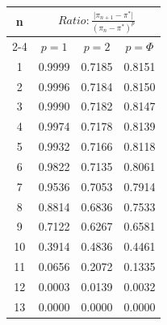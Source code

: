 \documentclass{article}
\providecommand{\abs}[1]{\lvert#1\rvert}
\begin{document}
\begin{tabular}{|c|c|c|c|}
\hline
\multirow{2}{*}{n} & \multicolumn{3}{|c|}{$Ratio:\displaystyle\frac{\abs{\pi_{n+1}-\pi^*}}{({\pi_{n}-\pi^*})^p}$} \\
\cline{2-4}
 & $p=1$ & $p=2$ & $p=\Phi$ \\
\hline
 1 & 0.9999 & 0.7185 & 0.8151 \\ 
  2 & 0.9996 & 0.7184 & 0.8150 \\ 
  3 & 0.9990 & 0.7182 & 0.8147 \\ 
  4 & 0.9974 & 0.7178 & 0.8139 \\ 
  5 & 0.9932 & 0.7166 & 0.8118 \\ 
  6 & 0.9822 & 0.7135 & 0.8061 \\ 
  7 & 0.9536 & 0.7053 & 0.7914 \\ 
  8 & 0.8814 & 0.6836 & 0.7533 \\ 
  9 & 0.7122 & 0.6267 & 0.6581 \\ 
 10 & 0.3914 & 0.4836 & 0.4461 \\ 
 11 & 0.0656 & 0.2072 & 0.1335 \\ 
 12 & 0.0003 & 0.0139 & 0.0032 \\ 
 13 & 0.0000 & 0.0000 & 0.0000 \\ 
 \hline 
\end{tabular}
\end{document}
